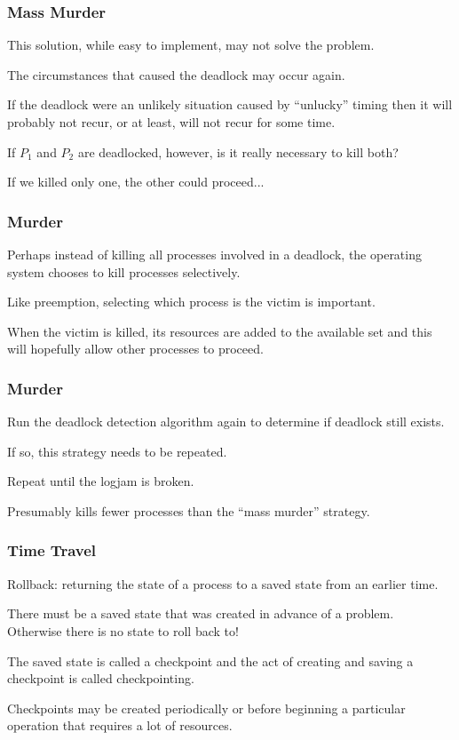 \begin{frame}
\frametitle{Mass Murder}

This solution, while easy to implement, may not solve the problem. 

The circumstances that caused the deadlock may occur again. 

If the deadlock were an unlikely situation caused by ``unlucky'' timing then it will probably not recur, or at least, will not recur for some time.

If $P_{1}$ and $P_{2}$ are deadlocked, however, is it really necessary to kill both? 

If we killed only one, the other could proceed...

\end{frame}

\begin{frame}
\frametitle{Murder}

Perhaps instead of killing all processes involved in a deadlock, the operating system chooses to kill processes selectively. 

Like preemption, selecting which process is the victim is important. 

When the victim is killed, its resources are added to the available set and this will hopefully allow other processes to proceed. 

\end{frame}

\begin{frame}
\frametitle{Murder}
Run the deadlock detection algorithm again to determine if deadlock still exists. 

If so, this strategy needs to be repeated.

Repeat until the logjam is broken.

Presumably kills fewer processes than the ``mass murder'' strategy.

\end{frame}

\begin{frame}
\frametitle{Time Travel}

\alert{Rollback}: returning the state of a process to a saved state from an earlier time. 

There must be a saved state that was created in advance of a problem. \\
\quad Otherwise there is no state to roll back to!

The saved state is called a \alert{checkpoint} and the act of creating and saving a checkpoint is called \alert{checkpointing}.

Checkpoints may be created periodically or before beginning a particular operation that requires a lot of resources.

\end{frame}

